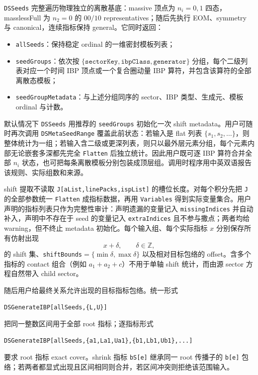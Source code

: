 ﻿\documentclass[a4paper,11pt]{article}
\begin{document}
\texttt{DSSeeds} 完整遍历物理独立的离散基底：massive 顶点为 $n_i=0,1$ 四态，masslessFull 为 $n_2=0$ 的 $00/10$ representatives；随后先执行 EOM、symmetry 与 canonical，连续指标保持 general。它同时返回：
\begin{itemize}
  \item \texttt{allSeeds}：保持稳定 ordinal 的一维密封模板列表；
  \item \texttt{seedGroups}：依次按 $\{\texttt{sectorKey},\texttt{ibpClass},\texttt{generator}\}$ 分组，每个二级列表对应一个时间 IBP 顶点或一个复合圈动量 IBP 算符，并包含该算符的全部离散态模板；
  \item \texttt{seedGroupMetadata}：与上述分组同序的 sector、IBP 类型、生成元、模板 ordinal 与计数。
\end{itemize}
默认情况下 \texttt{DSSeeds} 用推荐的 \texttt{seedGroups} 初始化一次 shift metadata。用户可随时再次调用 \texttt{DSMetaSeedRange} 覆盖此前状态：若输入是 flat 列表 $\{s_1,s_2,\ldots\}$，则整体统计为一组；若输入含二级或更深列表，则只以最外层元素分组，每个元素内部无论嵌套多深都先完全 \texttt{Flatten} 后独立统计。因此用户既可逐 IBP 算符合并全部 $n_i$ 状态，也可把每条离散模板分别包装成顶层组。调用时程序用中英双语报告该规则、实际组数和来源。

shift 提取不读取 \texttt{J[aList,linePacks,ispList]} 的槽位长度。对每个积分先把 \texttt{J} 的全部参数统一 \texttt{Flatten} 成指标数据，再用 \texttt{Variables} 得到实际变量集合。用户声明的指标列表只作为完整性审计：声明遗漏的变量记入 \texttt{missingIndices} 并自动补入，声明中不存在于 seed 的变量记入 \texttt{extraIndices} 且不参与撒点；两者均给 warning，但不终止 metadata 初始化。每个输入组、每个实际指标 $x$ 分别保存所有仿射出现
\begin{equation}
 x+\delta,\qquad \delta\in\mathbb Z,
\end{equation}
的 shift 集、\texttt{shiftBounds}$=\{\min\delta,\max\delta\}$ 以及相对目标包络的 offset。含多个指标的 contact 组合（例如 $a_1+a_2+c$）不用于单轴 shift 统计，而由源 sector 方程自然带入 child sector。

随后用户给最终关系允许出现的目标指标包络。统一形式
\begin{verbatim}
DSGenerateIBP[allSeeds,{L,U}]
\end{verbatim}
把同一整数区间用于全部 root 指标；逐指标形式
\begin{verbatim}
DSGenerateIBP[allSeeds,{a1,La1,Ua1},{b1,Lb1,Ub1},...]
\end{verbatim}
要求 root 指标 exact cover。shrink 指标 \texttt{bS[e]} 继承同一 root 传播子的 \texttt{b[e]} 包络；若两者都显式出现且区间相同则合并，若区间冲突则拒绝该范围输入。
\end{document}
